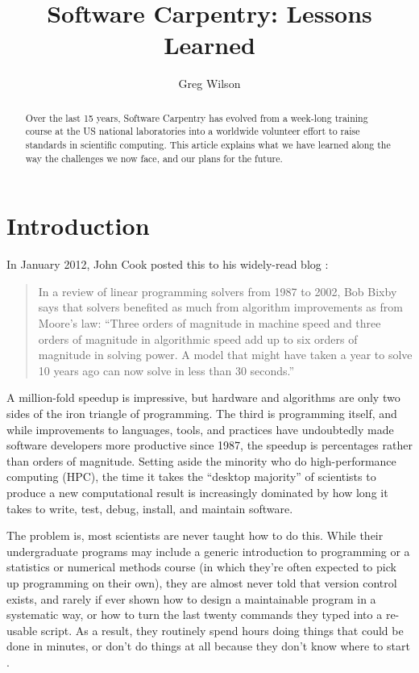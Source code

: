 \documentclass[10pt,a4paper,twocolumn]{article}
\begin{document}
\title{Software Carpentry: Lessons Learned}
\author[1]{Greg Wilson}

\maketitle
\thispagestyle{fancy}

\begin{abstract}

Over the last 15 years, Software Carpentry has evolved from a week-long
training course at the US national laboratories into a worldwide
volunteer effort to raise standards in scientific computing. This
article explains what we have learned along the way the challenges we
now face, and our plans for the future.

\end{abstract}
\clearpage

\section*{Introduction}

In January 2012, John Cook posted this to his widely-read blog
\cite{cook2012}:

\begin{quote}
In a review of linear programming solvers from 1987 to 2002, Bob Bixby
says that solvers benefited as much from algorithm improvements as from
Moore's law: ``Three orders of magnitude in machine speed and three
orders of magnitude in algorithmic speed add up to six orders of
magnitude in solving power. A model that might have taken a year to
solve 10 years ago can now solve in less than 30 seconds.''
\end{quote}

A million-fold speedup is impressive, but hardware and algorithms are
only two sides of the iron triangle of programming. The third is
programming itself, and while improvements to languages, tools, and
practices have undoubtedly made software developers more productive
since 1987, the speedup is percentages rather than orders of magnitude.
Setting aside the minority who do high-performance computing (HPC), the
time it takes the ``desktop majority'' of scientists to produce a new
computational result is increasingly dominated by how long it takes to
write, test, debug, install, and maintain software.

The problem is, most scientists are never taught how to do this. While
their undergraduate programs may include a generic introduction to
programming or a statistics or numerical methods course (in which
they're often expected to pick up programming on their own), they are
almost never told that version control exists, and rarely if ever shown
how to design a maintainable program in a systematic way, or how to turn
the last twenty commands they typed into a re-usable script. As a
result, they routinely spend hours doing things that could be done in
minutes, or don't do things at all because they don't know where to
start \cite{hannay2009,prabhu2011}.
\end{document}
